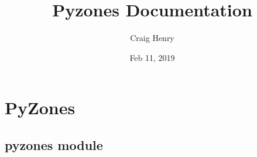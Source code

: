 \documentclass[letterpaper,10pt,english]{sphinxmanual}
\title{Pyzones Documentation}
\date{Feb 11, 2019}
\author{Craig Henry}
\begin{document}
\pagestyle{empty}
\sphinxmaketitle
\pagestyle{plain}
\sphinxtableofcontents
\pagestyle{normal}
\label{\detokenize{index::doc}}



\chapter{PyZones}
\label{\detokenize{source/modules:pyzones}}\label{\detokenize{source/modules::doc}}

\section{pyzones module}
\label{\detokenize{source/pyzones:module-pyzones}}\label{\detokenize{source/pyzones:pyzones-module}}\label{\detokenize{source/pyzones::doc}}
\end{document}
